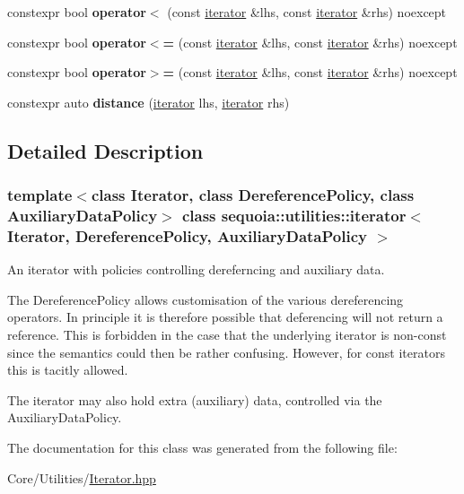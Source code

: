 \begin{DoxyCompactItemize}
constexpr bool {\bfseries operator$<$} (const \mbox{\hyperlink{classsequoia_1_1utilities_1_1iterator}{iterator}} \&lhs, const \mbox{\hyperlink{classsequoia_1_1utilities_1_1iterator}{iterator}} \&rhs) noexcept
\item 
\mbox{\label{classsequoia_1_1utilities_1_1iterator_a03e896fd960e9f457ac0c28703adbc0e}} 
constexpr bool {\bfseries operator$<$=} (const \mbox{\hyperlink{classsequoia_1_1utilities_1_1iterator}{iterator}} \&lhs, const \mbox{\hyperlink{classsequoia_1_1utilities_1_1iterator}{iterator}} \&rhs) noexcept
\item 
\mbox{\label{classsequoia_1_1utilities_1_1iterator_ae5a820a6abec8178568e72b4010d9262}} 
constexpr bool {\bfseries operator$>$=} (const \mbox{\hyperlink{classsequoia_1_1utilities_1_1iterator}{iterator}} \&lhs, const \mbox{\hyperlink{classsequoia_1_1utilities_1_1iterator}{iterator}} \&rhs) noexcept
\item 
\mbox{\label{classsequoia_1_1utilities_1_1iterator_ae1d5fa3395b5367bf186e63b78e5b260}} 
constexpr auto {\bfseries distance} (\mbox{\hyperlink{classsequoia_1_1utilities_1_1iterator}{iterator}} lhs, \mbox{\hyperlink{classsequoia_1_1utilities_1_1iterator}{iterator}} rhs)
\end{DoxyCompactItemize}


\subsection{Detailed Description}
\subsubsection*{template$<$class Iterator, class Dereference\+Policy, class Auxiliary\+Data\+Policy$>$\newline
class sequoia\+::utilities\+::iterator$<$ Iterator, Dereference\+Policy, Auxiliary\+Data\+Policy $>$}

An iterator with policies controlling dereferncing and auxiliary data. 

The Dereference\+Policy allows customisation of the various dereferencing operators. In principle it is therefore possible that deferencing will not return a reference. This is forbidden in the case that the underlying iterator is non-\/const since the semantics could then be rather confusing. However, for const iterators this is tacitly allowed.

The iterator may also hold extra (auxiliary) data, controlled via the Auxiliary\+Data\+Policy. 

The documentation for this class was generated from the following file\+:\begin{DoxyCompactItemize}
\item 
Core/\+Utilities/\mbox{\hyperlink{_iterator_8hpp}{Iterator.\+hpp}}\end{DoxyCompactItemize}
